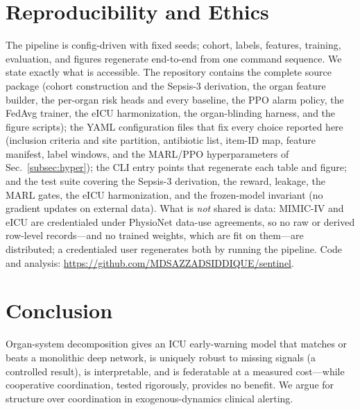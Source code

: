 \documentclass[conference]{IEEEtran}
\begin{document}
\section{Reproducibility and Ethics}
The pipeline is config-driven with fixed seeds; cohort, labels, features, training,
evaluation, and figures regenerate end-to-end from one command sequence. We state
exactly what is accessible. The repository contains the complete source package
(cohort construction and the Sepsis-3 derivation, the organ feature builder, the
per-organ risk heads and every baseline, the PPO alarm policy, the FedAvg
trainer, the eICU harmonization, the organ-blinding harness, and the figure
scripts); the YAML configuration files that fix every choice reported here
(inclusion criteria and site partition, antibiotic list, item-ID map, feature
manifest, label windows, and the MARL/PPO hyperparameters of
Sec.~\ref{subsec:hyper}); the CLI entry points that regenerate each table and
figure; and the test suite covering the Sepsis-3 derivation, the reward, leakage,
the MARL gates, the eICU harmonization, and the frozen-model invariant (no
gradient updates on external data). What is \emph{not} shared is data: MIMIC-IV
and eICU are credentialed under PhysioNet data-use agreements, so no raw or
derived row-level records---and no trained weights, which are fit on them---are
distributed; a credentialed user regenerates both by running the pipeline. Code
and analysis:
\url{https://github.com/MDSAZZADSIDDIQUE/sentinel}.

\section{Conclusion}
Organ-system decomposition gives an ICU early-warning model that matches or beats a
monolithic deep network, is uniquely robust to missing signals (a controlled result),
is interpretable, and is federatable at a measured cost---while cooperative
coordination, tested rigorously, provides no benefit. We argue for structure over
coordination in exogenous-dynamics clinical alerting.



\end{document}
